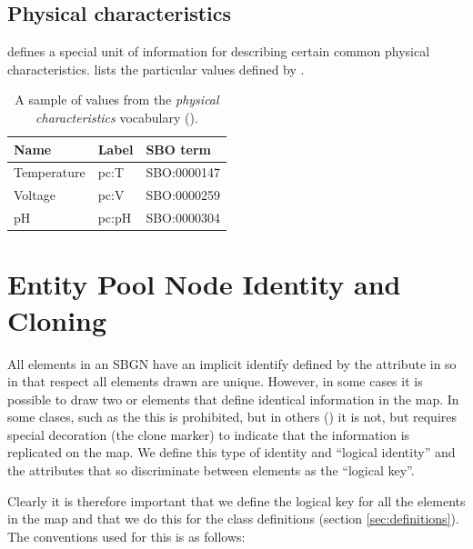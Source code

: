 \subsection{Physical characteristics}
\label{sec:physical-characteristics-cv}

\SBGNPDLone defines a special unit of information for describing
certain common physical characteristics.
 lists the particular values defined
by \SBGNPDLone.


\begin{table}[h]
  \centering
  \begin{tabular}{l>{\ttfamily}l>{\ttfamily}l}
    \toprule
    \textbf{Name}   & \textbf{\rmfamily Label} & \textbf{\rmfamily SBO term} \\
    \midrule
    Temperature   & pc:T  & SBO:0000147\\
    Voltage       & pc:V  & SBO:0000259\\
    pH            & pc:pH & SBO:0000304\\
    \bottomrule
  \end{tabular}
  \caption{A sample of values from the \emph{physical
      characteristics} vocabulary ().}
  \label{tab:physical-characteristics-cv}
\end{table}

\section{Entity Pool Node Identity and Cloning}
\label{sec:epnuniqueness}
\label{sec:uniquenessdefinition}

All elements in an SBGN \PDm have an implicit identify defined by the
 attribute in  so in that respect all
elements drawn are unique. However, in some cases it is possible to
draw two or elements that define identical information in the map. In
some clases, such as the  this is prohibited, but in
others () it is not, but requires
special decoration (the clone marker) to indicate that the information
is replicated on the map. We define this type of identity and
``logical identity'' and the attributes that so discriminate between
elements as the ``logical key''.

Clearly it is therefore important that we define the logical key for
all the elements in the map and that we do this for the class definitions
(section \ref{sec:definitions}). The conventions used for this is as
follows:

